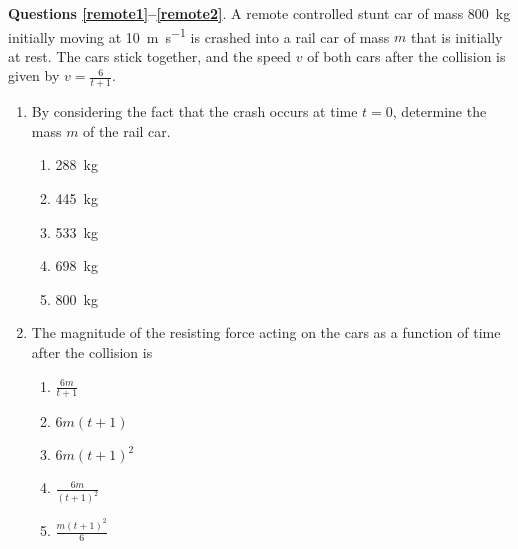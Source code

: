 \documentclass{../../../oss-apphys}
\begin{document}
\begin{multicols}{2}
  \textbf{Questions \ref{remote1}--\ref{remote2}}. A remote controlled stunt
  car of mass \SI{800}{\kilo\gram} initially moving at
  \SI{10}{\metre\per\second} is crashed into a rail car of mass $m$ that is
  initially at rest. The cars stick together, and the speed $v$ of both cars
  after the collision is given by $\displaystyle v=\frac{6}{t+1}$.

  \begin{enumerate}[resume,leftmargin=18pt]
  \item By considering the fact that the crash occurs at time $t=0$, determine
    the mass $m$ of the rail car.
    \label{remote1}
    \begin{enumerate}[nosep,leftmargin=18pt,label=(\Alph*)]
    \item\SI{288}{\kilo\gram}
    \item\SI{445}{\kilo\gram}
    \item\SI{533}{\kilo\gram}
    \item\SI{698}{\kilo\gram}
    \item\SI{800}{\kilo\gram}
    \end{enumerate}
    
  \item The magnitude of the resisting force acting on the cars as a function of
    time after the collision is
    \label{remote2}
    \begin{enumerate}[nosep,leftmargin=18pt,label=(\Alph*)]
    \item $\displaystyle \frac{6m}{t+1}$
    \item $6m(t+1)$
    \item $6m(t+1)^2$
    \item $\displaystyle\frac{6m}{(t+1)^2}$
    \item $\displaystyle\frac{m(t+1)^2}{6}$
    \end{enumerate}
    
    

\end{enumerate}
\end{multicols}
\end{document}
